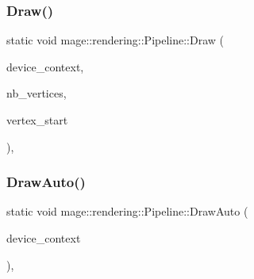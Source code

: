 \subsubsection{\texorpdfstring{Draw()}{Draw()}}
{\footnotesize\ttfamily static void mage\+::rendering\+::\+Pipeline\+::\+Draw (\begin{DoxyParamCaption}\item[{I\+D3\+D11\+Device\+Context \&}]{device\+\_\+context,  }\item[{\mbox{\hyperlink{namespacemage_aa5d6eaabaac3cdd01873d6a3d27e90f3}{U32}}}]{nb\+\_\+vertices,  }\item[{\mbox{\hyperlink{namespacemage_aa5d6eaabaac3cdd01873d6a3d27e90f3}{U32}}}]{vertex\+\_\+start }\end{DoxyParamCaption})\hspace{0.3cm}{\ttfamily [static]}, {\ttfamily [noexcept]}}

\mbox{\label{structmage_1_1rendering_1_1_pipeline_a30cdc51051e3fcab0d3a9c36efad40e4}} 
\subsubsection{\texorpdfstring{Draw\+Auto()}{DrawAuto()}}
{\footnotesize\ttfamily static void mage\+::rendering\+::\+Pipeline\+::\+Draw\+Auto (\begin{DoxyParamCaption}\item[{I\+D3\+D11\+Device\+Context \&}]{device\+\_\+context }\end{DoxyParamCaption})\hspace{0.3cm}{\ttfamily [static]}, {\ttfamily [noexcept]}}

\mbox{\label{structmage_1_1rendering_1_1_pipeline_a8be1904461ee6bcd5e4b5b72d5cb79a8}} 
